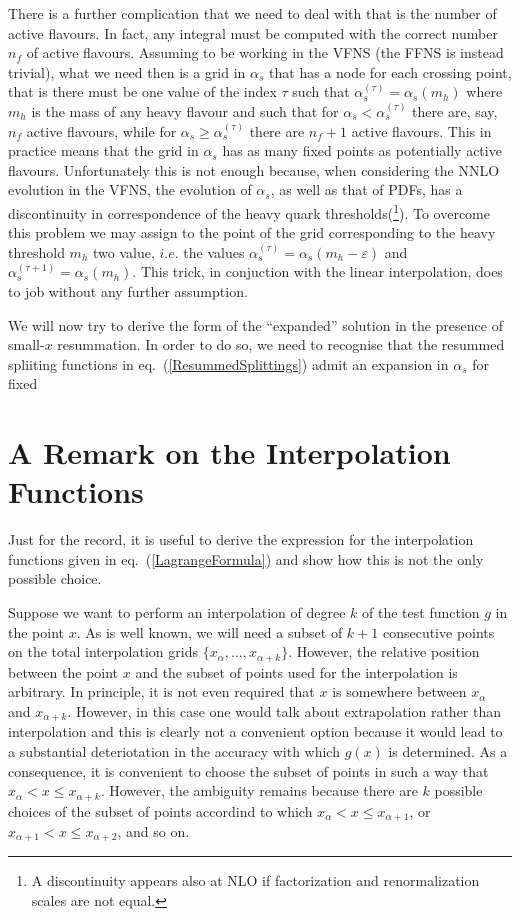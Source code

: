 \documentclass[10pt,a4paper]{article}
\begin{document}
There is a further complication that we need to deal with that is the
number of active flavours. In fact, any integral must be computed with
the correct number $n_f$ of active flavours. Assuming to be working in
the VFNS (the FFNS is instead trivial), what we need then is a grid in
$\alpha_s$ that has a node for each crossing point, that is there must
be one value of the index $\tau$ such that
$\alpha_s^{(\tau)}=\alpha_s(m_h)$ where $m_h$ is the mass of any heavy
flavour and such that for $\alpha_s<\alpha_s^{(\tau)}$ there are, say,
$n_f$ active flavours, while for $\alpha_s\geq\alpha_s^{(\tau)}$ there
are $n_f+1$ active flavours. This in practice means that the grid in
$\alpha_s$ has as many fixed points as potentially active
flavours. Unfortunately this is not enough because, when considering
the NNLO evolution in the VFNS, the evolution of $\alpha_s$, as well
as that of PDFs, has a discontinuity in correspondence of the heavy
quark thresholds(\footnote{A discontinuity appears also at NLO if
  factorization and renormalization scales are not equal.}). To
overcome this problem we may assign to the point of the grid
corresponding to the heavy threshold $m_h$ two value, $i.e.$ the
values $\alpha_s^{(\tau)}=\alpha_s(m_h-\varepsilon)$ and
$\alpha_s^{(\tau+1)}=\alpha_s(m_h)$. This trick, in conjuction with
the linear interpolation, does to job without any further assumption.

We will now try to derive the form of the ``expanded'' solution in the
presence of small-$x$ resummation. In order to do so, we need to
recognise that the resummed spliiting functions in
eq.~(\ref{ResummedSplittings}) admit an expansion in $\alpha_s$ for fixed



\appendix

\section{A Remark on the Interpolation Functions}

Just for the record, it is useful to derive the expression for the
interpolation functions given in eq.~(\ref{LagrangeFormula}) and show
how this is not the only possible choice.

Suppose we want to perform an interpolation of degree $k$ of the test
function $g$ in the point $x$. As is well known, we will need a subset
of $k+1$ consecutive points on the total interpolation grids
$\{x_{\alpha},\dots,x_{\alpha+k}\}$. However, the relative position
between the point $x$ and the subset of points used for the
interpolation is arbitrary. In principle, it is not even required that
$x$ is somewhere between $x_\alpha$ and $x_{\alpha+k}$. However, in
this case one would talk about extrapolation rather than interpolation
and this is clearly not a convenient option because it would lead to a
substantial deteriotation in the accuracy with which $g(x)$ is
determined. As a consequence, it is convenient to choose the subset of
points in such a way that $x_\alpha < x \leq x_{\alpha+k}$. However,
the ambiguity remains because there are $k$ possible choices of the
subset of points accordind to which $x_\alpha < x \leq x_{\alpha+1}$,
or $x_{\alpha+1} < x \leq x_{\alpha+2}$, and so on.
\end{document}
